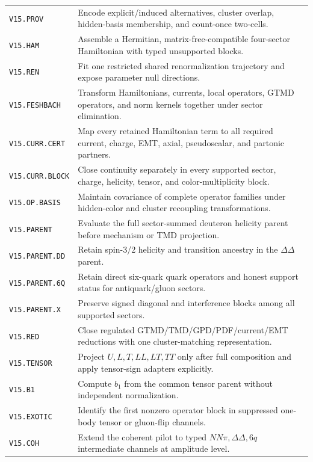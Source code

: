 \documentclass[11pt]{article}
\begin{document}
{\begin{longtable}{L{0.23\textwidth}L{0.69\textwidth}}
\texttt{V15.PROV} & Encode explicit/induced alternatives, cluster overlap, hidden-basis membership, and count-once two-cells. \\
\texttt{V15.HAM} & Assemble a Hermitian, matrix-free-compatible four-sector Hamiltonian with typed unsupported blocks. \\
\texttt{V15.REN} & Fit one restricted shared renormalization trajectory and expose parameter null directions. \\
\texttt{V15.FESHBACH} & Transform Hamiltonians, currents, local operators, GTMD operators, and norm kernels together under sector elimination. \\
\texttt{V15.CURR.CERT} & Map every retained Hamiltonian term to all required current, charge, EMT, axial, pseudoscalar, and partonic partners. \\
\texttt{V15.CURR.BLOCK} & Close continuity separately in every supported sector, charge, helicity, tensor, and color-multiplicity block. \\
\texttt{V15.OP.BASIS} & Maintain covariance of complete operator families under hidden-color and cluster recoupling transformations. \\
\texttt{V15.PARENT} & Evaluate the full sector-summed deuteron helicity parent before mechanism or TMD projection. \\
\texttt{V15.PARENT.DD} & Retain spin-3/2 helicity and transition ancestry in the \(\Delta\Delta\) parent. \\
\texttt{V15.PARENT.6Q} & Retain direct six-quark quark operators and honest support status for antiquark/gluon sectors. \\
\texttt{V15.PARENT.X} & Preserve signed diagonal and interference blocks among all supported sectors. \\
\texttt{V15.RED} & Close regulated GTMD/TMD/GPD/PDF/current/EMT reductions with one cluster-matching representation. \\
\texttt{V15.TENSOR} & Project \(U,L,T,LL,LT,TT\) only after full composition and apply tensor-sign adapters explicitly. \\
\texttt{V15.B1} & Compute \(b_1\) from the common tensor parent without independent normalization. \\
\texttt{V15.EXOTIC} & Identify the first nonzero operator block in suppressed one-body tensor or gluon-flip channels. \\
\texttt{V15.COH} & Extend the coherent pilot to typed \(NN\pi,\Delta\Delta,6q\) intermediate channels at amplitude level. \\

\end{longtable}}
\end{document}
